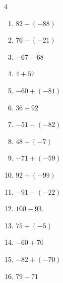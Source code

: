 \begin{multicols}{4}
\begin{enumerate}
        \phantom{$=132$}

  \item $82-(-88)$

        \phantom{$=170$}

  \item $76-(-21)$

        \phantom{$=97$}

  \item $-67-68$

        \phantom{$=-135$}

  \item $4+57$

        \phantom{$=61$}

  \item $-60+(-81)$

        \phantom{$=-141$}

  \item $36+92$

        \phantom{$=128$}

  \item $-51-(-82)$

        \phantom{$=31$}

  \item $48+(-7)$

        \phantom{$=41$}

  \item $-71+(-59)$

        \phantom{$=-130$}

  \item $92+(-99)$

        \phantom{$=-7$}

  \item $-91-(-22)$

        \phantom{$=-69$}

  \item $100-93$

        \phantom{$=7$}

  \item $75+(-5)$

        \phantom{$=70$}

  \item $-60+70$

        \phantom{$=10$}

  \item $-82+(-70)$

        \phantom{$=-152$}

  \item $79-71$


\end{enumerate}
\end{multicols}
